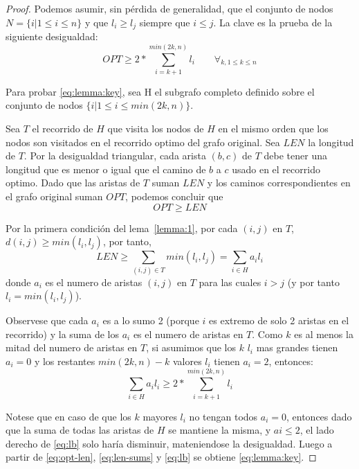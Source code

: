 \documentclass[spanish]{llncs}
\begin{document}
\begin{proof}
	Podemos asumir, sin pérdida de generalidad, que el conjunto de nodos
	$N = \{i \vert 1 \le i \le n\}$ y que $l_i \ge l_j$ siempre que $i \le j$.
	La clave es la prueba de la siguiente desigualdad:
	\begin{equation}
		\label{eq:lemma:key}
		OPT \ge 2 * \sum_{i=k+1}^{min(2k,n)} l_i \qquad \forall_{k, 1 \le k \le n}
	\end{equation}

	Para probar \eqref{eq:lemma:key}, sea H el subgrafo completo definido sobre
	el conjunto de nodos $\{i \vert 1 \le i \le min(2k,n)\}$.

	Sea $T$ el recorrido de $H$ que visita los nodos de $H$ en el mismo orden
	que los nodos son visitados en el recorrido optimo del grafo original. Sea
	$LEN$ la longitud de $T$. Por la desigualdad triangular, cada arista $(b,c)$
	de $T$ debe tener una longitud que es menor o igual que el camino de $b$ a $c$
	usado en el recorrido optimo. Dado que las aristas de $T$ suman $LEN$ y los
	caminos correspondientes en el grafo original suman $OPT$, podemos concluir que
	\begin{equation}
		\label{eq:opt-len}
		OPT \ge LEN
	\end{equation}

	Por la primera condición del lema~\ref{lemma:1}, por cada $(i,j)$ en $T$,
	$d(i,j) \ge min(l_i,l_j)$, por tanto,
	\begin{equation}
		\label{eq:len-sums}
		LEN \ge \sum_{(i,j) \in T} min(l_i,l_j) = \sum_{i \in H} a_il_i
	\end{equation}
	donde $a_i$ es el numero de aristas $(i,j)$ en $T$ para las cuales $i>j$
	(y por tanto $l_i = min(l_i,l_j)$).

	Observese que cada $a_i$ es a lo sumo 2 (porque $i$ es extremo de solo
	2 aristas en el recorrido) y la suma de los $a_i$ es el numero de aristas
	en $T$. Como $k$ es al menos la mitad del numero de aristas en $T$, si asumimos
	que los $k$ $l_i$ mas grandes tienen $a_i=0$ y los restantes $min(2k,n)-k$ valores
	$l_i$ tienen $a_i=2$, entonces:
	\begin{equation}
		\label{eq:lb}
		\sum_{i \in H} a_il_i \ge 2 * \sum_{i=k+1}^{min(2k,n)}l_i
	\end{equation}
	
	Notese que en caso de que los $k$ mayores $l_i$ no tengan todos $a_i=0$, entonces
	dado que la suma de todas las aristas de $H$ se mantiene la misma, y $ai \le 2$,
	el lado derecho de \eqref{eq:lb} solo haría disminuir, mateniendose la desigualdad.
	Luego a partir de \eqref{eq:opt-len}, \eqref{eq:len-sums} y \eqref{eq:lb} se obtiene
	\eqref{eq:lemma:key}.


\end{proof}
\end{document}
